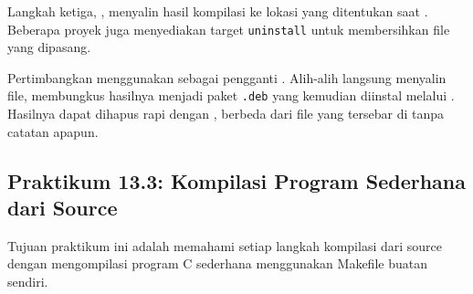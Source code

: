 Langkah ketiga, , menyalin hasil kompilasi ke lokasi
yang ditentukan saat . Beberapa proyek juga menyediakan target
\texttt{uninstall} untuk membersihkan file yang dipasang.

\begin{tipbox}
Pertimbangkan menggunakan  sebagai pengganti .
Alih-alih langsung menyalin file,  membungkus hasilnya menjadi
paket \texttt{.deb} yang kemudian diinstal melalui . Hasilnya dapat
dihapus rapi dengan , berbeda dari file yang tersebar di
 tanpa catatan apapun.
\end{tipbox}

\subsection*{Praktikum 13.3: Kompilasi Program Sederhana dari Source}

Tujuan praktikum ini adalah memahami setiap langkah kompilasi dari source
dengan mengompilasi program C sederhana menggunakan Makefile buatan sendiri.

